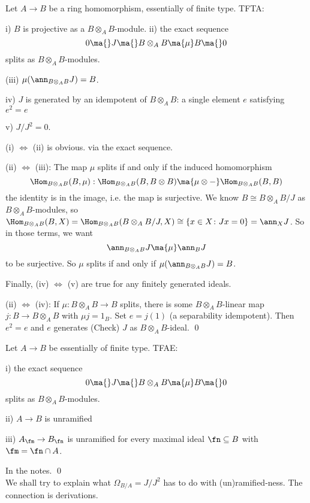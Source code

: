 \begin{lem}
Let $A \to B$ be a ring homomorphism, essentially of finite type. TFTA:

i) $B$ is projective as a $B \otimes_A B$-module.
ii) the exact sequence
	\[
	0 \ma{} J \ma{} B \otimes_A B \ma{\mu} B \ma{} 0
	\]
splits as $B \otimes_A B$-modules. 

(iii) $\mu(\ann_{B \otimes_A B} J)= B$. 

iv) $J$ is generated by an idempotent of $B \otimes_A B$: a single element $e$ satisfying $e^2=e$

v) $J/J^2=0$.  
\end{lem}

\pf (i) $\iff$ (ii) is obvious. via the exact sequence. 

(ii) $\iff$ (iii): The map $\mu$ splits if and only if the induced homomorphism 
	\[
	\Hom_{B \otimes_A B}(B,\mu): \Hom_{B \otimes_A B} (B, B \otimes B) \ma{\mu \otimes -} \Hom_{B \otimes_A B}(B,B)
	\]
the identity is in the image, i.e. the map is surjective. We know $B \cong B \otimes_A B/J$ as $B \otimes_A B$-modules, so $\Hom_{B \otimes_A B}(B,X)= \Hom_{B \otimes_A B}(B \otimes_A B/J,X) \cong \{ x \in X \colon Jx=0 \} = \ann_X J$. So in those terms, we want
	\[
	\ann_{B \otimes_A B} J \ma{\mu} \ann_B J
	\]
to be surjective. So $\mu$ splits if and only if $\mu(\ann_{B \otimes_A B} J)= B$. 

Finally, (iv) $\iff$ (v) are true for any finitely generated ideals. 

(ii)  $\iff$ (iv): If $\mu: B \otimes_A B \to B$ splits, there is some $B \otimes_A B$-linear map $j: B \to B \otimes_A B$ with $\mu j= 1_B$. Set $e=j(1)$ (a separability idempotent). Then $e^2=e$ and $e$ generates (Check) $J$ as $B \otimes_A B$-ideal. \qed \\


\begin{prop}
Let $A \to B$ be essentially of finite type. TFAE:

i) the exact sequence 
	\[
	0 \ma{} J \ma{} B \otimes_A B \ma{\mu} B \ma{} 0
	\]
splits as $B \otimes_A B$-modules. 

ii) $A \to B$ is unramified

iii) $A_\fm \to B_\fn$ is unramified for every maximal ideal $\fn \subseteq B$ with $\fm= \fn \cap A$. 
\end{prop}

\pf In the notes. \qed \\


We shall try to explain what $\Omega_{B/A}= J/J^2$ has to do with (un)ramified-ness. The connection is derivations. 


